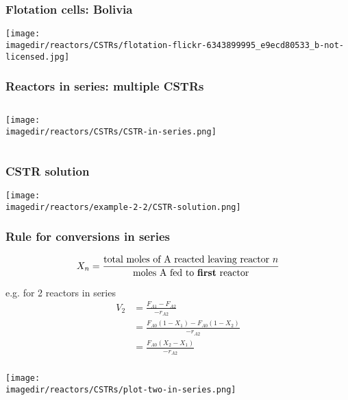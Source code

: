\begin{frame}\frametitle{Flotation cells: Bolivia}
	\begin{center}
		\texttt{[image: \\imagedir/reactors/CSTRs/flotation-flickr-6343899995\_e9ecd80533\_b-not-licensed.jpg]}
	\end{center}
\end{frame}

\begin{frame}\frametitle{Reactors in series: multiple CSTRs}
	\begin{columns}[t]
			\begin{center}
				\texttt{[image: \\imagedir/reactors/CSTRs/CSTR-in-series.png]}
			\end{center}
	\end{columns}
\end{frame}

\begin{frame}\frametitle{CSTR solution}
	\begin{center}
		\texttt{[image: \\imagedir/reactors/example-2-2/CSTR-solution.png]}
	\end{center}
\end{frame}

\begin{frame}\frametitle{Rule for conversions in series}
	\begin{exampleblock}{}
		$$X_n = \frac{\text{total moles of A reacted leaving reactor }n}{\text{moles A fed to \textbf{first} reactor}}$$
	\end{exampleblock}
	
	\vspace{12pt}
	e.g. for 2 reactors in series
	\begin{align*}
		V_2 &= \frac{F_{A1} - F_{A2}}{-r_{A2}}\\
			&= \frac{F_{A0}(1 - X_1) - F_{A0}(1 - X_2)}{-r_{A2}}\\
			&= \frac{F_{A0}(X_2 - X_1)}{-r_{A2}}
	\end{align*}
\end{frame}

\begin{frame}\frametitle{}
	\begin{center}
		\texttt{[image: \\imagedir/reactors/CSTRs/plot-two-in-series.png]}
	\end{center}
\end{frame}


